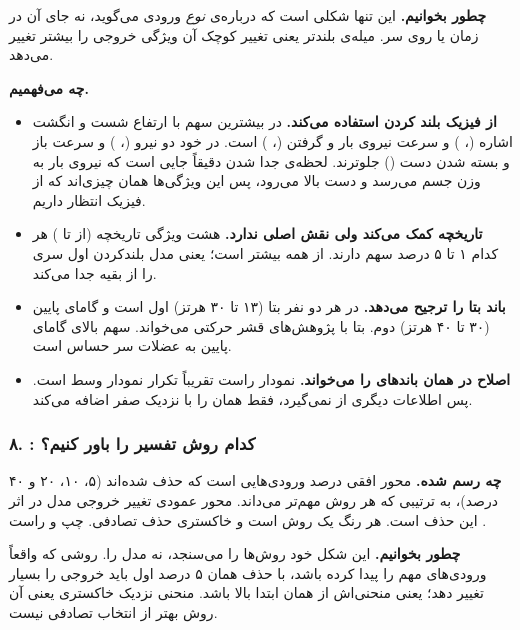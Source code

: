 \textbf{چطور بخوانیم.} این تنها شکلی است که درباره‌ی \emph{نوع} ورودی می‌گوید، نه جای آن در زمان یا روی سر. میله‌ی بلندتر یعنی تغییر کوچک آن ویژگی خروجی را بیشتر تغییر می‌دهد.

\textbf{چه می‌فهمیم.}
\begin{itemize}
\item \textbf{ از فیزیک بلند کردن استفاده می‌کند.} در  بیشترین سهم با ارتفاع شست و انگشت اشاره (، ) و سرعت نیروی بار و گرفتن (، ) است. در  خود دو نیرو (، ) و سرعت باز و بسته شدن دست () جلوترند. لحظه‌ی جدا شدن دقیقاً جایی است که نیروی بار به وزن جسم می‌رسد و دست بالا می‌رود، پس این ویژگی‌ها همان چیزی‌اند که از فیزیک انتظار داریم.
\item \textbf{تاریخچه کمک می‌کند ولی نقش اصلی ندارد.} هشت ویژگی تاریخچه (از  تا ) هر کدام ۱ تا ۵ درصد سهم دارند.  از همه بیشتر است؛ یعنی مدل بلندکردن اول سری را از بقیه جدا می‌کند.
\item \textbf{ باند بتا را ترجیح می‌دهد.} در هر دو نفر بتا (۱۳ تا ۳۰ هرتز) اول است و گامای پایین (۳۰ تا ۴۰ هرتز) دوم. بتا با پژوهش‌های قشر حرکتی می‌خواند. سهم بالای گامای پایین به  عضلات سر حساس است.
\item \textbf{اصلاح  در  همان باندهای  را می‌خواند.} نمودار راست تقریباً تکرار نمودار وسط است. پس  اطلاعات دیگری از  نمی‌گیرد، فقط همان را با  نزدیک صفر اضافه می‌کند.
\end{itemize}


\subsubsection*{۸. : کدام روش تفسیر را باور کنیم؟}

\textbf{چه رسم شده.} محور افقی درصد ورودی‌هایی است که حذف شده‌اند (۵، ۱۰، ۲۰ و ۴۰ درصد)، به ترتیبی که هر روش مهم‌تر می‌داند. محور عمودی تغییر خروجی مدل در اثر این حذف است. هر رنگ یک روش است و خاکستری حذف تصادفی. چپ  و راست .

\textbf{چطور بخوانیم.} این شکل خود روش‌ها را می‌سنجد، نه مدل را. روشی که واقعاً ورودی‌های مهم را پیدا کرده باشد، با حذف همان ۵ درصد اول باید خروجی را بسیار تغییر دهد؛ یعنی منحنی‌اش از همان ابتدا بالا باشد. منحنی نزدیک خاکستری یعنی آن روش بهتر از انتخاب تصادفی نیست.

